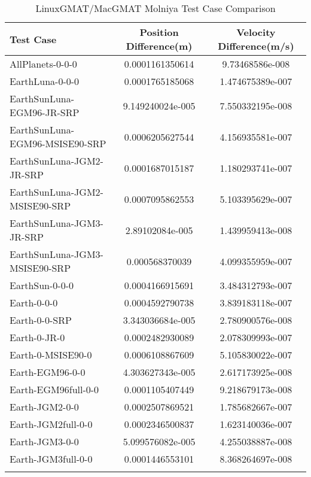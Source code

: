 \begin{table}[htbp!]
\centering
\caption{ LinuxGMAT/MacGMAT Molniya Test Case Comparison}
      \begin{tabular}{lcc}
      \hline\hline
          Test Case & Position Difference(m) & Velocity Difference(m/s) \\
         \hline
         AllPlanets-0-0-0 & 0.0001161350614 & 9.73468586e-008 \\
         EarthLuna-0-0-0 & 0.0001765185068 & 1.474675389e-007 \\
         EarthSunLuna-EGM96-JR-SRP & 9.149240024e-005 & 7.550332195e-008 \\
         EarthSunLuna-EGM96-MSISE90-SRP & 0.0006205627544 & 4.156935581e-007 \\
         EarthSunLuna-JGM2-JR-SRP & 0.0001687015187 & 1.180293741e-007 \\
         EarthSunLuna-JGM2-MSISE90-SRP & 0.0007095862553 & 5.103395629e-007 \\
         EarthSunLuna-JGM3-JR-SRP & 2.89102084e-005 & 1.439959413e-008 \\
         EarthSunLuna-JGM3-MSISE90-SRP & 0.000568370039 & 4.099355959e-007 \\
         EarthSun-0-0-0 & 0.0004166915691 & 3.484312793e-007 \\
         Earth-0-0-0 & 0.0004592790738 & 3.839183118e-007 \\
         Earth-0-0-SRP & 3.343036684e-005 & 2.780900576e-008 \\
         Earth-0-JR-0 & 0.0002482930089 & 2.078309993e-007 \\
         Earth-0-MSISE90-0 & 0.0006108867609 & 5.105830022e-007 \\
         Earth-EGM96-0-0 & 4.303627343e-005 & 2.617173925e-008 \\
         Earth-EGM96full-0-0 & 0.0001105407449 & 9.218679173e-008 \\
         Earth-JGM2-0-0 & 0.0002507869521 & 1.785682667e-007 \\
         Earth-JGM2full-0-0 & 0.0002346500837 & 1.623140036e-007 \\
         Earth-JGM3-0-0 & 5.099576082e-005 & 4.255038887e-008 \\
         Earth-JGM3full-0-0 & 0.0001446553101 & 8.368264697e-008 \\
      \hline\hline
      \label{Table: Molniya LinuxGMAT-MacGMAT Table} 
\end{tabular}
\end{table}
